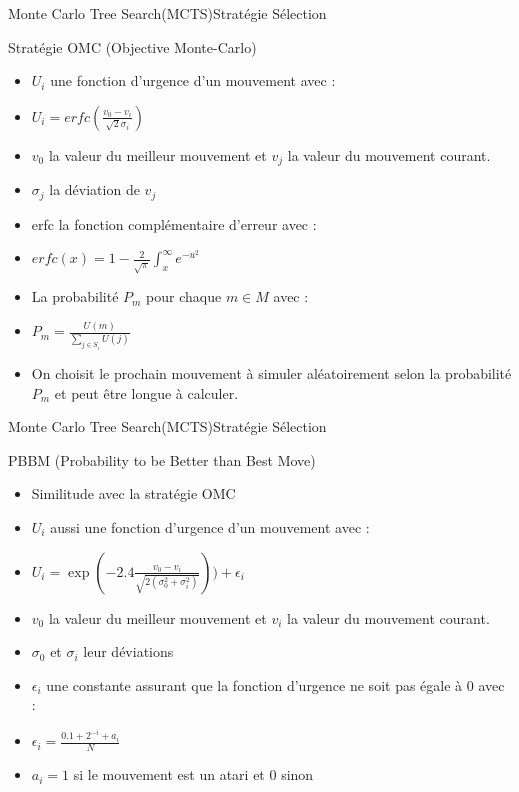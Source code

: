\begin{frame}{Monte Carlo Tree Search(MCTS)}{Stratégie Sélection}
	\begin{block}{Stratégie OMC (Objective Monte-Carlo)}
		\begin{itemize}
			\item $U_{i}$ une fonction d'urgence d'un mouvement avec :
			\item $U_{i} = erfc(\frac{v_{0} - v_{i}}{\sqrt{2}\sigma_{i}})$
			\item $v_{0}$ la valeur du meilleur mouvement et $v_{j}$ la valeur du mouvement courant.
			\item $\sigma_{j}$ la déviation de $v_{j}$
			\item erfc la fonction complémentaire d'erreur avec :
			\item $erfc(x) = 1 - \frac{2}{\sqrt{\pi}}\int_{x}^{\infty}e^{-u^{2}}$
			\item La probabilité $P_{m}$ pour chaque $m \in M$ avec :
			\item $P_{m} = \frac{U(m)}{\sum_{j \in S_{i}}^{}U(j)}$
			\item On choisit le prochain mouvement à simuler aléatoirement selon la probabilité $P_{m}$ et peut être longue à calculer.
		\end{itemize}
	\end{block}
\end{frame}

\begin{frame}{Monte Carlo Tree Search(MCTS)}{Stratégie Sélection}
	\begin{block}{PBBM (Probability to be Better than Best Move)}
		\begin{itemize}
			\item Similitude avec la stratégie OMC
			\item $U_{i}$ aussi une fonction d'urgence d'un mouvement avec :
			\item $U_{i} = \exp(-2.4\frac{v_{0} - v_{i}}{\sqrt{2(\sigma_{0}^2 + \sigma_{i}^2)}})) + \epsilon_{i}$
			\item $v_{0}$ la valeur du meilleur mouvement et $v_{i}$ la valeur du mouvement courant.
			\item $\sigma_{0}$ et $\sigma_{i}$ leur déviations
			\item $\epsilon_ {i}$ une constante assurant que la fonction d'urgence ne soit pas égale à 0 avec :
			\item $\epsilon_ {i} = \frac{0.1 + 2^{-i} + a_{i}}{N}$
			\item $a_{i} = 1$ si le mouvement est un atari et $0$ sinon 
		\end{itemize}
	\end{block}
\end{frame}

